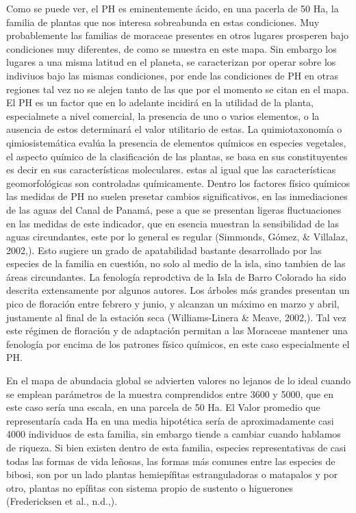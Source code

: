 \documentclass[11pt,]{article}
\begin{document}
Como se puede ver, el PH es eminentemente ácido, en una pacerla de 50
Ha, la familia de plantas que nos interesa sobreabunda en estas
condiciones. Muy probablemente las familias de moraceae presentes en
otros lugares prosperen bajo condiciones muy diferentes, de como se
muestra en este mapa. Sin embargo los lugares a una misma latitud en el
planeta, se caracterizan por operar sobre los indiviuos bajo las mismas
condiciones, por ende las condiciones de PH en otras regiones tal vez no
se alejen tanto de las que por el momento se citan en el mapa. El PH es
un factor que en lo adelante incidirá en la utilidad de la planta,
especialmete a nivel comercial, la presencia de uno o varios elementos,
o la ausencia de estos determinará el valor utilitario de estas. La
quimiotaxonomía o qimiosistemática evalúa la presencia de elementos
químicos en especies vegetales, el aspecto químico de la clasificación
de las plantas, se basa en sus constituyentes es decir en sus
características moleculares. estas al igual que las características
geomorfológicas son controladas químicamente. Dentro los factores físico
químicos las medidas de PH no suelen presetar cambios significativos, en
las inmediaciones de las aguas del Canal de Panamá, pese a que se
presentan ligeras fluctuaciones en las medidas de este indicador, que en
esencia muestran la sensibilidad de las aguas circundantes, este por lo
general es regular (Simmonds, Gómez, \& Villalaz, 2002,). Esto sugiere
un grado de apatabilidad bastante desarrollado por las especies de la
familia en cuestión, no solo al medio de la isla, sino tambien de las
áreas circundantes. La fenología reprodctiva de la Isla de Barro
Colorado ha sido descrita extensamente por algunos autores. Los árboles
más grandes presentan un pico de floración entre febrero y junio, y
alcanzan un máximo en marzo y abril, justamente al final de la estación
seca (Williams-Linera \& Meave, 2002,). Tal vez este régimen de
floración y de adaptación permitan a las Moraceae mantener una fenología
por encima de los patrones físico químicos, en este caso especialmente
el PH.

En el mapa de abundacia global se advierten valores no lejanos de lo
ideal cuando se emplean parámetros de la muestra comprendidos entre 3600
y 5000, que en este caso sería una escala, en una parcela de 50 Ha. El
Valor promedio que representaría cada Ha en una media hipotética sería
de aproximadamente casi 4000 individuos de esta familia, sin embargo
tiende a cambiar cuando hablamos de riqueza. Si bien existen dentro de
esta familia, especies representativas de casi todas las formas de vida
leñosas, las formas más comunes entre las especies de bibosi, son por un
lado plantas hemiepífitas estranguladoras o matapalos y por otro,
plantas no epífitas con sistema propio de sustento o higuerones
(Fredericksen et al., n.d.,).
\end{document}
